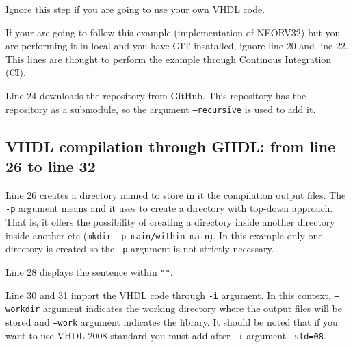 \label{ci:lines}

Ignore this step if you are going to use your own VHDL code.

\vspace{5mm}

\noindent If your are going to follow this example (implementation of NEORV32) but you are performing it in local and you have GIT insatalled, ignore line 20 and line 22. 
This lines are thought to perform the example through Continous Integration (CI).

\vspace{5mm}

\noindent Line 24 downloads the  repository  from GitHub. 
This repository has the  repository as a submodule, so the argument \texttt{--recursive} is used to add it.

\subsection{VHDL compilation through GHDL: from line 26 to line 32}

Line 26 creates a directory named  to store in it the compilation output files. The \texttt{-p} argument means  and it uses to create a directory with top-down approach. 
That is, it offers the possibility of creating a directory inside another directory inside another etc (\texttt{mkdir -p main/within_main}). 
In this example only one directory is created so the \texttt{-p} argument is not strictly necessary.

\vspace{5mm}

\noindent Line 28 displays the sentence within \texttt{""}.

\vspace{5mm} 

\noindent Line 30 and 31 import the VHDL code through \texttt{-i} argument. 
In this context, \texttt{--workdir} argument indicates the working directory where the output files will be stored and \texttt{--work} argument indicates the  library. 
It should be noted that if you want to use VHDL 2008 standard you must add after \texttt{-i} argument \texttt{--std=08}.

\vspace{5mm} 

